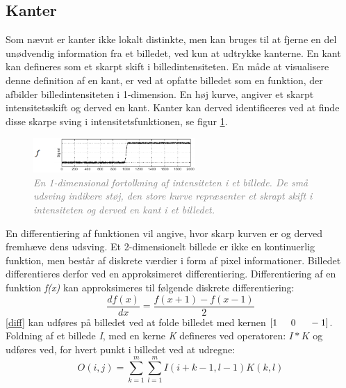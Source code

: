 \subsection{Kanter}\label{subsec:kant}
Som nævnt er kanter ikke lokalt distinkte, men kan bruges til at fjerne en del unødvendig information fra et billedet, ved kun at udtrykke kanterne.  En kant kan defineres som et skarpt skift i billedintensiteten. 
En måde at visualisere denne definition af en kant, er ved at opfatte billedet som en funktion, der afbilder billedintensiteten i 1-dimension. En høj kurve, angiver et skarpt intensitetsskift og derved en kant. Kanter kan derved identificeres ved at finde disse skarpe sving i intensitetsfunktionen, se figur \ref{fig:kant}.
\noindent
\begin{figure}[H]
    \centering
    \includegraphics[width=0.55\textwidth]{fig/7.png}
     \vspace{-1em}
    \begin{center}        
     \caption{\textcolor{gray}{\footnotesize \textit{
     En 1-dimensional fortolkning af intensiteten i et billede. De små udsving indikere støj, den store kurve repræsenter et skrapt skift i intensiteten og derved en kant i et billedet.}}}
    \label{fig:kant}
     \end{center}
       \vspace{-2.5em}
  \end{figure}
\noindent
En differentiering af funktionen vil angive, hvor skarp kurven er og derved fremhæve dens udsving. Et 2-dimensionelt billede er ikke en kontinuerlig funktion, men består af diskrete værdier i form af pixel informationer.
Billedet differentieres derfor ved en approksimeret differentiering. Differentiering af en funktion \emph{f(x)} kan approksimeres til følgende diskrete differentiering:
\begin{equation}
\dfrac{df(x)}{dx}=\dfrac{f(x+1)-f(x-1)}{2}
\label{diff}
\end{equation}
\eqref{diff} kan udføres på billedet ved at folde billedet med kernen $[1 \hspace{0.5cm} 0 \hspace{0.5cm} -1]$. Foldning af et billede \emph{I}, med en kerne \emph{K} defineres ved operatoren: $I\ast K$ og udføres ved, for hvert punkt i billedet ved at udregne:
\begin{equation}
O(i,j) = \sum\limits_{k=1}^m \sum\limits_{l=1}^m I(i+k-1,l-1)K(k,l)
\end{equation}

